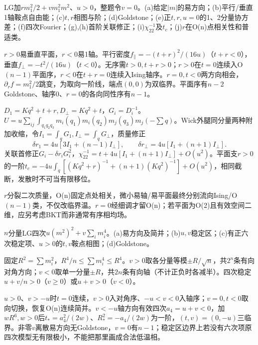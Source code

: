 \begin{exercise}[原题4(a)--(j)]\label{r:334-2-4}
LG加$r m_1^2/2+v m_1^2m^2$、$u>0$，整题令$v=0$。(a)给定$|m|$的易方向；(b)平行/垂直1轴鞍点自由能；(c)$t,r$相图与阶；(d)Goldstone；(e)正$t,r,u=0$的1、2分量协方差；(f)四次Fourier；(g),(h)首阶关联修正；(i)$\chi_{22}^{-1}$及$t_c$；(j)$r$在O(n)点相关性和普适类。
\end{exercise}
\begin{solution}
$r>0$易垂直平面，$r<0$易1轴。平行密度$f_\parallel=-(t+r)^2/(16u)$（$t+r<0$），垂直$f_\perp=-t^2/(16u)$（$t<0$）。无序需$t>0,t+r>0$；$r>0$在$t=0$连续入O$(n-1)$平面序，$r<0$在$t+r=0$连续入Ising轴序。$r=0,t<0$两方向相会，$\partial_rf=m_1^2/2$跳变，为取向一阶线，端点$(0,0)$为双临界。平面序有$n-2$ Goldstone、轴序0、$r=0$的各向同性序有$n-1$。

$D_1=Kq^2+t+r,D_\perp=Kq^2+t$，$G_i=D_i^{-1}$。$U=u\sum_{ij}\int_{q_1q_2q_3}m_i(q_1)m_i(q_2)m_j(q_3)m_j(-\sum q)$。Wick外腿同分量两种附加收缩，令$I_1=\int_qG_1,I_\perp=\int_qG_\perp$，质量修正
\begin{equation}
\delta r_1=4u[3I_1+(n-1)I_\perp],\qquad\delta r_\perp=4u[I_1+(n+1)I_\perp].
\end{equation}
关联首修正$G_i-\delta r_iG_i^2$，$\chi_{22}^{-1}=t+4u[I_1+(n+1)I_\perp]+O(u^2)$。平面支$r>0$的一阶$t_c=-4u\int_q[(Kq^2+r)^{-1}+(n+1)(Kq^2)^{-1}]+O(u^2)$，相同截断，发散时不可当有限移位。

$r$分裂二次质量，O(n)固定点处相关，微小易轴/易平面最终分别流向Ising/O$(n-1)$类，不仅改临界温。$r=0$经细调才留O(n)；若平面为O(2)且有效空间二维，应另考虑BKT而非通常有序相均场。
\end{solution}
\begin{exercise}[原题5(a)--(d)]\label{r:334-2-5}
$n$分量LG四次$u(m^2)^2+v\sum_im_i^4$。(a)易方向及简并；(b)$u,v$稳定区；(c)有正六次稳定项、$u>0$的$t,v$鞍点相图；(d)Goldstone。
\end{exercise}
\begin{solution}
固定$R^2=\sum m_i^2$，$R^4/n\le\sum m_i^4\le R^4$。$v>0$取各分量等模$\pm R/\sqrt n$，共$2^n$条有向对角方向；$v<0$取单一分量$\pm R$，共$2n$条有向轴（不计正负时各减半）。四次稳定$u+v/n>0$（$v\ge0$）或$u+v>0$（$v<0$）。

$u>0$、$v>-u$时$t=0$连续，$v>0$入对角序、$-u<v<0$入轴序；$v=0,t<0$取向切换，恢复O(n)连续简并。$v<-u$轴方向有效四次$a_4=u+v<0$，加$wR^6,w>0$后$t_*=a_4^2/(2w)$、$R_*^2=-a_4/(2w)$为一阶，$(t,v)=(0,-u)$三临界。非零$v$离散易方向无Goldstone，$v=0$有$n-1$；稳定区边界上若没有六次项原四次模型无有限极小，不能把那里画成合法低温相。
\end{solution}
